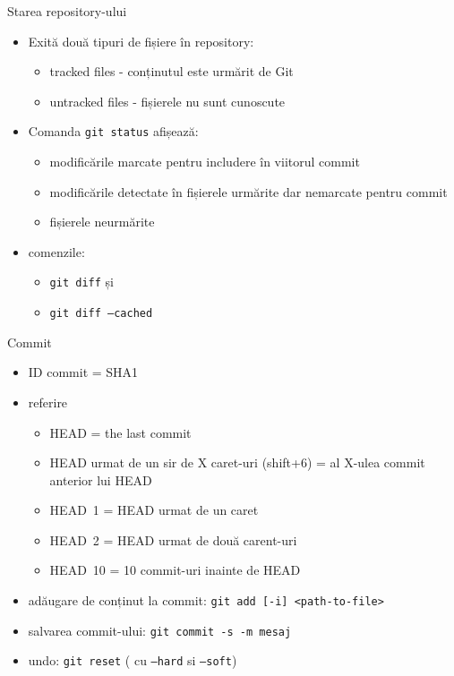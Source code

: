 \documentclass{beamer}
\begin{document}
\begin{frame}{Starea repository-ului}
\begin{itemize} %
\item Exită două tipuri de fișiere în repository:
\begin{itemize} %
	\item tracked files - conținutul este urmărit de Git
	\item untracked files - fișierele nu sunt cunoscute
\end{itemize}
\pause\item Comanda \texttt{git status} afișează:
\begin{itemize} %
	\item modificările marcate pentru includere în viitorul commit
	\item modificările detectate în fișierele urmărite dar nemarcate pentru commit
	\item fișierele neurmărite
\end{itemize}
\item comenzile:
\begin{itemize} %
	\item \texttt{git diff} și
	\item \texttt{git diff --cached}
\end{itemize}
\end{itemize}
\end{frame}

\begin{frame}{Commit}
\begin{itemize} %
\item ID commit = SHA1
\item referire
\begin{itemize}
	\item HEAD = the last commit
	\item HEAD urmat de un sir de X caret-uri (shift+6) = al X-ulea commit anterior lui HEAD
	\item HEAD~1 = HEAD urmat de un caret
    \item HEAD~2 = HEAD urmat de două carent-uri
    \item HEAD~10 = 10 commit-uri inainte de HEAD
\end{itemize}
\pause\item adăugare de conținut la commit: \texttt{git add [-i] <path-to-file>}
\item salvarea commit-ului: \texttt{git commit -s -m mesaj}
\item undo: \texttt{git reset} ( cu \texttt{--hard} si \texttt{--soft})
\end{itemize}
\end{frame}
\end{document}
